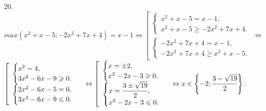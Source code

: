 20. $max(x^2+x-5;-2x^2+7x+4)=x-1\Leftrightarrow\left[\begin{array}{l}\begin{cases}x^2+x-5=x-1,\\ x^2+x-5\geqslant -2x^2+7x+4.\end{cases}\\ \begin{cases}-2x^2+7x+4=x-1,\\ -2x^2+7x+4\geqslant x^2+x-5.\end{cases}\end{array}\right. \Leftrightarrow$\\$\left[\begin{array}{l}\begin{cases}x^2=4,\\ 3x^2-6x-9\geqslant 0.\end{cases}\\ \begin{cases} 2x^2-6x-5=0,\\ 3x^2-6x-9\leqslant0.\end{cases}\end{array}\right.\Leftrightarrow\left[\begin{array}{l}\begin{cases}x=\pm2,\\ x^2-2x-3\geqslant 0.\end{cases}\\ \begin{cases} x=\cfrac{3\pm\sqrt{19}}{2},\\ x^2-2x-3\leqslant 0.\end{cases}\end{array}\right.\Leftrightarrow x\in\left\{-2;\cfrac{3-\sqrt{19}}{2}\right\}.$\\
